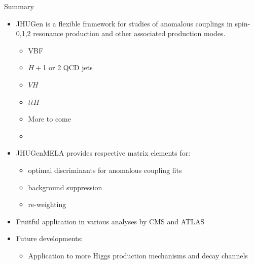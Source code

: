 \documentclass[usenames,dvipsnames,svgnames,table]{beamer}
\begin{document}
\begin{frame}{Summary}
\begin{itemize}
\item JHUGen is a flexible framework for studies of anomalous couplings in spin-0,1,2 resonance production and other associated production modes.
\begin{multicols}{2}
\begin{itemize}
\item VBF
\item $H+$1 or 2 QCD jets
\item $VH$
\item $t\bar{t}H$
\item More to come
\item %
\end{itemize}
\end{multicols}
\item JHUGenMELA provides respective matrix elements for:
\begin{itemize}
\item optimal discriminants for anomalous coupling fits
\item background suppression
\item re-weighting
\end{itemize}
\item Fruitful application in various analyses by CMS and ATLAS
\item Future developments:
\begin{itemize}
\item Application to more Higgs production mechanisms and decay channels
\end{itemize}
\end{itemize}
\end{frame}
\end{document}
